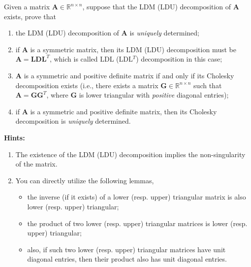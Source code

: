 \documentclass[english,onecolumn]{IEEEtran}
\begin{document}
\noindent Given a matrix $\mathbf{A}\in\mathbb{R}^{n\times n}$, suppose that the LDM (LDU) decomposition of $\mathbf{A}$ exists, prove that
\begin{enumerate}
	\item the LDM (LDU) decomposition of $\mathbf{A}$ is \textit{uniquely} determined;
	\item if $\mathbf{A}$ is a symmetric matrix, then its LDM (LDU) decomposition must be $\mathbf{A}=\mathbf{L}\mathbf{D}\mathbf{L}^T$, which is called LDL (LDL$^T$) decomposition in this case;
	\item $\mathbf{A}$ is a symmetric and positive definite matrix if and only if its Cholesky decomposition exists (i.e., there exists a matrix $\mathbf{G}\in\mathbb{R}^{n\times n}$ such that $\mathbf{A}=\mathbf{G}\mathbf{G}^T$, where $\mathbf{G}$ is lower triangular with \textit{positive} diagonal entries);
	\item if $\mathbf{A}$ is a symmetric and positive definite matrix, then its Cholesky decomposition is \textit{uniquely} determined.	
\end{enumerate}

\textbf{Hints:}  
\begin{enumerate}
    \item The existence of the LDM (LDU) decomposition implies the non-singularity of the matrix.
    \item You can directly utilize the following lemmas,
\begin{itemize}
    \item the inverse (if it exists) of a lower (resp. upper) triangular matrix is also lower (resp. upper) triangular;
    \item the product of two lower (resp. upper) triangular matrices is lower (resp. upper) triangular;
    \item also, if such two lower (resp. upper) triangular matrices have unit diagonal entries, then their product also has unit diagonal entries.
\end{itemize}
\end{enumerate}

  
\end{document}
